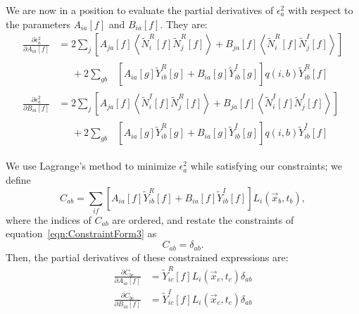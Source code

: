 We are now in a position to evaluate the partial derivatives of $\epsilon^2_a$ with respect to the parameters $A_{ia}[f]$ and $B_{ia}[f]$.  They are:
\begin{subequations}\begin{align}
\frac{\partial \epsilon^2_a}{\partial A_{ia}[f]} &= 2 \sum_j \left[ A_{ja}[f] \left<\widetilde{N}_i^R[f]\widetilde{N}_j^R[f]\right> + B_{ja}[f] \left<\widetilde{N}_i^R[f]\widetilde{N}_j^I[f]\right>\right] \nonumber \\
&\quad \begin{aligned}
 {} + 2 \sum_{gb} & \left[A_{ia}[g] \widetilde{Y}_{ib}^R[g] + B_{ia}[g] \widetilde{Y}_{ib}^I[g]\right] q(i,b) \widetilde{Y}_{ib}^R[f] \end{aligned}\\
%
\frac{\partial \epsilon^2_a}{\partial B_{ia}[f]} &= 2 \sum_j \left[ A_{ja}[f] \left<\widetilde{N}_i^I[f]\widetilde{N}_j^R[f]\right> + B_{ja}[f] \left<\widetilde{N}_i^I[f]\widetilde{N}_j^I[f]\right>\right] \nonumber \\
&\quad \begin{aligned}
 {} + 2 \sum_{gb} & \left[A_{ia}[g] \widetilde{Y}_{ib}^R[g] + B_{ia}[g] \widetilde{Y}_{ib}^I[g]\right] q(i,b) \widetilde{Y}_{ib}^I[f] \end{aligned}
\end{align}\end{subequations}

We use Lagrange's method to minimize $\epsilon^2_a$ while satisfying our constraints; we define
\begin{equation}
C_{ab} = \sum_{if}\left[A_{ia}[f] \widetilde{Y}_{ib}^R[f] + B_{ia}[f] \widetilde{Y}_{ib}^I[f]\right] L_i(\vec{x}_b,t_b),
\end{equation}
where the indices of $C_{ab}$ are ordered, and restate the constraints of equation~\ref{eqn:ConstraintForm3} as
\begin{equation}
C_{ab} = \delta_{ab}.
\end{equation}
Then, the partial derivatives of these constrained expressions are:
\begin{subequations}\begin{align}
\frac{\partial C_{bc}}{\partial A_{ia}[f]} &= \widetilde{Y}^R_{ic}[f] L_i(\vec{x}_c,t_c) \delta_{ab} \\
\frac{\partial C_{bc}}{\partial B_{ia}[f]} &= \widetilde{Y}^I_{ic}[f] L_i(\vec{x}_c,t_c) \delta_{ab}
\end{align}\end{subequations}

